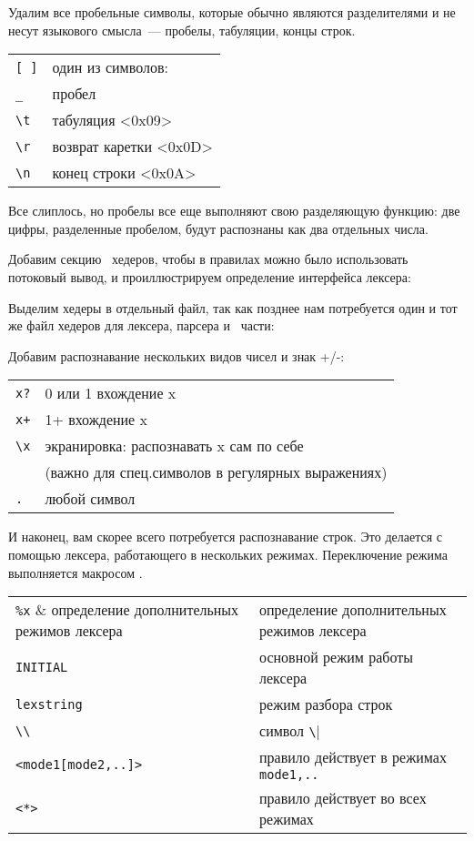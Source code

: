 Удалим все пробельные символы, которые обычно
являются разделителями и не несут языкового смысла\ --- пробелы, табуляции,
концы строк.
\begin{tabular}{l l}
\verb|[ ]| & один из символов: \\
\verb|_| & пробел \\
\verb|\t| & табуляция <0x09> \\
\verb|\r| & возврат каретки <0x0D> \\
\verb|\n| & конец строки <0x0A> \\
\end{tabular}

Все слиплось, но пробелы все еще выполняют свою разделяющую функцию: две цифры,
разделенные пробелом, будут распознаны как два отдельных числа.

\bigskip
Добавим секцию \cpp\ хедеров, чтобы в правилах можно было использовать потоковый
вывод, и проиллюстрируем определение интерфейса лексера:


Выделим хедеры в отдельный файл, так как позднее нам потребуется один и тот же
файл хедеров для лексера, парсера и \cpp\  части:


Добавим распознавание нескольких видов чисел и знак +/-: 

\begin{tabular}{l l}
\verb|x?| & 0 или 1 вхождение x \\
\verb|x+| & 1+ вхождение x \\
\verb|\x| & экранировка: распознавать x сам по себе \\&(важно для
спец.символов в регулярных выражениях)\\
\verb|.| & любой символ \\
\end{tabular}

И наконец, вам скорее всего потребуется распознавание строк. Это делается с
помощью лексера, работающего в нескольких режимах. Переключение режима
выполняется макросом .

\begin{tabular}{l l}
\verb|%x| & определение дополнительных режимов лексера \\
\verb|INITIAL| & основной режим работы лексера \\
\verb|lexstring| & режим разбора строк \\
\verb|\\| & символ \verb|\| \\
\verb|<mode1[mode2,..]>| & правило действует в режимах \verb|mode1,..| \\
\verb|<*>| & правило действует во всех режимах \\
\end{tabular}
